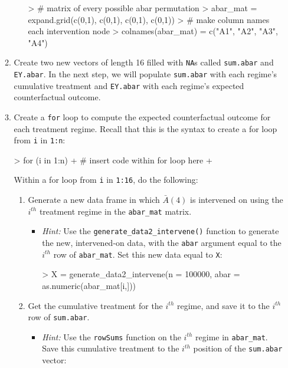 \documentclass[answers]{exam}
\begin{document}
\begin{enumerate}
\begin{enumerate}
\begin{itemize}
\begin{Schunk}
\begin{Sinput}
> # matrix of every possible abar permutation
> abar_mat = expand.grid(c(0,1), c(0,1), c(0,1), c(0,1))
> # make column names each intervention node
> colnames(abar_mat) = c("A1", "A2", "A3", "A4")
\end{Sinput}
\end{Schunk}
\end{itemize}
\item Create two new vectors of length 16 filled with \texttt{NA}s called \texttt{sum.abar} and \texttt{EY.abar}. In the next step, we will populate \texttt{sum.abar} with each regime's cumulative treatment and \texttt{EY.abar} with each regime's expected counterfactual outcome.
\item Create a \texttt{for} loop to compute the expected counterfactual outcome for each treatment regime. Recall that this is the syntax to create a for loop from \texttt{i} in \texttt{1:n}:
\begin{Schunk}
\begin{Sinput}
> for (i in 1:n) {
+   # insert code within for loop here
+ }
\end{Sinput}
\end{Schunk}
Within a for loop from \texttt{i} in \texttt{1:16}, do the following:
\begin{enumerate}
\item Generate a new data frame in which $\bar{A}(4)$ is intervened on using the $i^{th}$ treatment regime in the \texttt{abar\_mat} matrix.
\begin{itemize}
\item[] \textit{Hint:} Use the \texttt{generate\_data2\_intervene()} function to generate the new, intervened-on data, with the \texttt{abar} argument equal to the $i^{th}$ row of \texttt{abar\_mat}. Set this new data equal to \texttt{X}:
\begin{Schunk}
\begin{Sinput}
> X = generate_data2_intervene(n = 100000, abar = as.numeric(abar_mat[i,]))
\end{Sinput}
\end{Schunk}
\end{itemize}
\item Get the cumulative treatment for the $i^{th}$ regime, and save it to the $i^{th}$ row of \texttt{sum.abar}.
\begin{itemize}
\item[] \textit{Hint:} Use the \texttt{rowSums} function on the $i^{th}$ regime in \texttt{abar\_mat}. Save this cumulative treatment to the $i^{th}$ position of the \texttt{sum.abar} vector:

\end{itemize}
\end{enumerate}
\end{enumerate}
\end{enumerate}
\end{document}
